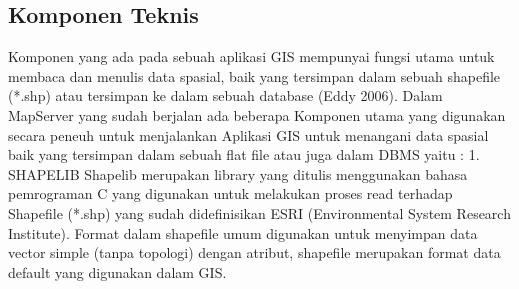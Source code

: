 \subsection{Komponen Teknis}
Komponen yang ada pada sebuah aplikasi GIS
mempunyai fungsi utama untuk membaca dan menulis
data spasial, baik yang tersimpan dalam sebuah
shapefile (*.shp) atau tersimpan ke dalam sebuah
database (Eddy 2006).
Dalam MapServer yang sudah berjalan ada beberapa
Komponen utama yang digunakan secara peneuh untuk
menjalankan Aplikasi GIS untuk menangani data
spasial baik yang tersimpan dalam sebuah flat file atau
juga dalam DBMS yaitu :
1. SHAPELIB
Shapelib merupakan library yang ditulis
menggunakan bahasa pemrograman C yang
digunakan untuk melakukan proses read terhadap
Shapefile (*.shp) yang sudah didefinisikan ESRI
(Environmental System Research Institute).
Format dalam shapefile umum digunakan untuk
menyimpan data vector simple (tanpa topologi)
dengan atribut, shapefile merupakan format data
default yang digunakan dalam GIS.
